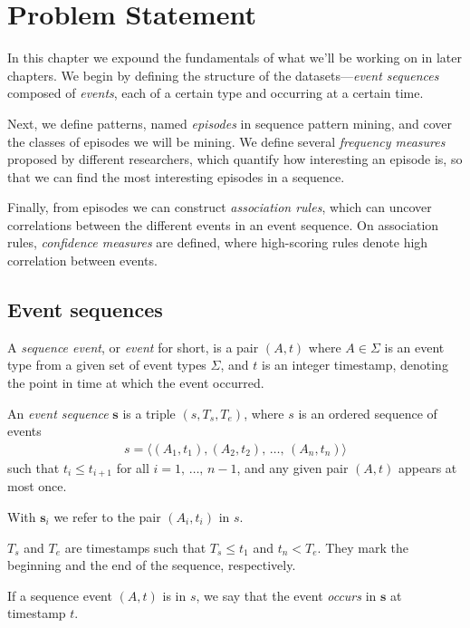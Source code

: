 \chapter{Problem Statement}
\label{sec:problem-statement}

In this chapter we expound the fundamentals of what we'll be working on in later chapters. We begin by defining the structure of the datasets---\emph{event sequences} composed of \emph{events}, each of a certain type and occurring at a certain time.

Next, we define patterns, named \emph{episodes} in sequence pattern mining, and cover the classes of episodes we will be mining. We define several \emph{frequency measures} proposed by different researchers, which quantify how interesting an episode is, so that we can find the most interesting episodes in a sequence.

Finally, from episodes we can construct \emph{association rules}, which can uncover correlations between the different events in an event sequence. On association rules, \emph{confidence measures} are defined, where high-scoring rules denote high correlation between events.

\section{Event sequences}

\begin{definition}
A \emph{sequence event}, or \emph{event} for short, is a pair $ (A, t) $ where $ A \in \Sigma $ is an event type from a given set of event types $ \Sigma $, and $ t $ is an integer timestamp, denoting the point in time at which the event occurred.
\end{definition}

\begin{definition}
An \emph{event sequence} $ \boldsymbol{s} $ is a triple $ (s, T_s, T_e) $, where $ s $ is an ordered sequence of events
\begin{align*}
s = \langle (A_1, t_1), (A_2, t_2), \, \ldots, \, (A_n, t_n) \rangle
\end{align*}
such that $ t_i \leq t_{i + 1} $ for all $ i = 1, \, \ldots, \, n - 1 $, and any given pair $ (A, t) $ appears at most once.

With $ \boldsymbol{s}_i $ we refer to the pair $ (A_i, t_i) $ in $ s $.

$ T_s $ and $ T_e $ are timestamps such that $ T_s \leq t_1 $ and $ t_n < T_e $. They mark the beginning and the end of the sequence, respectively.

If a sequence event $ (A, t) $ is in $ s $, we say that the event \emph{occurs} in $ \boldsymbol{s} $ at timestamp $ t $.
\end{definition}

